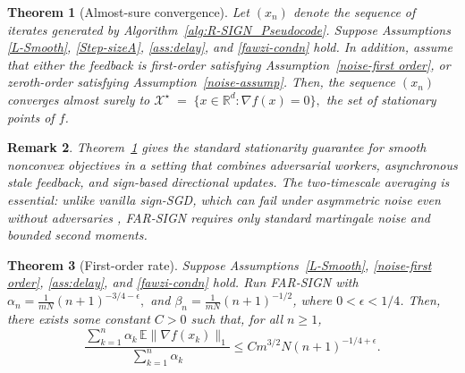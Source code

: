 \documentclass{article}
\newtheorem{theorem}{Theorem}[section]
\newtheorem{remark}[theorem]{Remark}
\newcommand{\farsign}{FAR-SIGN\xspace}
\begin{document}

\begin{theorem}[Almost-sure convergence]
\label{thm:almost.sure.conv}
Let $(x_n)$ denote the sequence of iterates generated by
Algorithm~\ref{alg:R-SIGN_Pseudocode}. Suppose Assumptions
\ref{L-Smooth}, \ref{Step-sizeA}, \ref{ass:delay}, and \ref{fawzi-condn} hold. In addition, assume that either the feedback is first-order satisfying Assumption~\ref{noise-first order}, or zeroth-order satisfying Assumption~\ref{noise-assump}. Then, the sequence $(x_n)$ converges almost surely to $\mathcal{X}^\star \;=\; \{x \in \mathbb{R}^d : \nabla f(x) = 0\},$ the set of stationary points of $f$.
%
\end{theorem}

\begin{remark}
Theorem~\ref{thm:almost.sure.conv} gives the standard stationarity guarantee
for smooth nonconvex objectives in a setting that combines adversarial workers,
asynchronous stale feedback, and sign-based directional updates. The
two-timescale averaging is essential: unlike vanilla sign-SGD, which can fail
under asymmetric noise even without adversaries \citep{karimireddy2019error},
\farsign requires only standard martingale noise and bounded second moments.
\end{remark}

\begin{theorem}[First-order rate]
\label{thm:rate_optimalfirstorder}
Suppose Assumptions~\ref{L-Smooth}, \ref{noise-first order}, \ref{ass:delay}, and \ref{fawzi-condn} hold. Run \farsign with
$\alpha_n = \frac{1}{mN} (n+1)^{-3/4-\epsilon},$ and
$\beta_n =\frac{1}{mN} (n+1)^{-1/2}$, where $0<\epsilon<1/4$. Then, there exists some constant $C>0$ such that, for all
$n\ge1$,
\[
    \frac{\sum_{k=1}^n \alpha_k\,\mathbb E\|\nabla f(x_k)\|_1}
    {\sum_{k=1}^n \alpha_k}
    \le
    C m^{3/2}N (n+1)^{-1/4+\epsilon}.
\]
\end{theorem}
\end{document}
